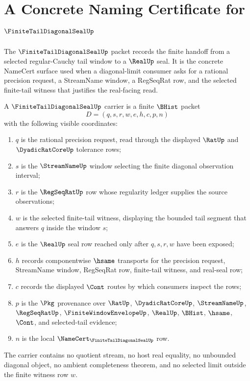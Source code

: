 \chapter{A Concrete Naming Certificate for $\FiniteTailDiagonalSealUp$}
\label{ch:concrete-instances-finitetaildiagonalseal-namecert}

The $\FiniteTailDiagonalSealUp$ packet records the finite handoff from a selected regular-Cauchy tail window to a $\RealUp$ seal. It is the concrete NameCert surface used when a diagonal-limit consumer asks for a rational precision request, a StreamName window, a RegSeqRat row, and the selected finite-tail witness that justifies the real-facing read.

\begin{definition}
\label{def:finite-tail-diagonal-seal-carrier}
A $\FiniteTailDiagonalSealUp$ carrier is a finite $\BHist$ packet
$$
D=(q,s,r,w,e,h,c,p,n)
$$
with the following visible coordinates:
\begin{enumerate}
\item $q$ is the rational precision request, read through the displayed $\RatUp$ and $\DyadicRatCoreUp$ tolerance rows;
\item $s$ is the $\StreamNameUp$ window selecting the finite diagonal observation interval;
\item $r$ is the $\RegSeqRatUp$ row whose regularity ledger supplies the source observations;
\item $w$ is the selected finite-tail witness, displaying the bounded tail segment that answers $q$ inside the window $s$;
\item $e$ is the $\RealUp$ seal row reached only after $q,s,r,w$ have been exposed;
\item $h$ records componentwise $\hsame$ transports for the precision request, StreamName window, RegSeqRat row, finite-tail witness, and real-seal row;
\item $c$ records the displayed $\Cont$ routes by which consumers inspect the rows;
\item $p$ is the $\Pkg$ provenance over $\RatUp$, $\DyadicRatCoreUp$, $\StreamNameUp$, $\RegSeqRatUp$, $\FiniteWindowEnvelopeUp$, $\RealUp$, $\BHist$, $\hsame$, $\Cont$, and selected-tail evidence;
\item $n$ is the local $\NameCert_{\FiniteTailDiagonalSealUp}$ row.
\end{enumerate}
The carrier contains no quotient stream, no host real equality, no unbounded diagonal object, no ambient completeness theorem, and no selected limit outside the finite witness row $w$.
\end{definition}

